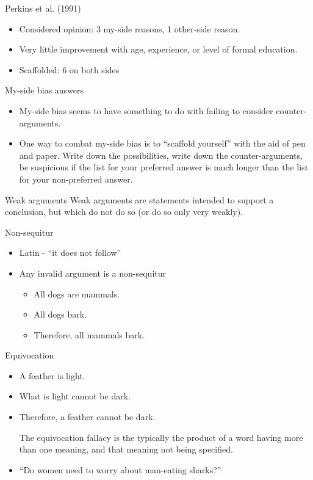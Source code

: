 \documentclass{beamer}
\begin{document}
\begin{frame}{Perkins et al. (1991)}
\begin{itemize}
\item Considered opinion: 3 my-side reasons, 1 other-side reason.
\item Very little improvement with age, experience, or level of formal education.
\item Scaffolded: 6 on both sides
\end{itemize}
\end{frame}

\begin{frame}{My-side bias answers}
\begin{itemize}
\item My-side bias seems to have something to do with failing to consider counter-arguments.
\item One way to combat my-side bias is to ``scaffold yourself'' with the aid of pen and paper. Write down the possibilities, write down the counter-arguments, be suspicious if the list for your preferred answer is much longer than the list for your non-preferred answer.
\end{itemize}
\end{frame}

\begin{frame}{Weak arguments}
Weak arguments are statements intended to support a conclusion, but which do not do so (or do so only very weakly). 
\end{frame}

\begin{frame}{Non-sequitur}
\begin{itemize}
\item Latin - ``it does not follow''
\item Any invalid argument is a non-sequitur
\begin{itemize}
	\item All dogs are mammals.
	\item All dogs bark.
	\item Therefore, all mammals bark.
\end{itemize}
\end{itemize}
\end{frame}

\begin{frame}{Equivocation}
\begin{itemize}
\item A feather is light.
\item What is light cannot be dark.
\item Therefore, a feather cannot be dark.

The equivocation fallacy is the typically the product of a word having more than one meaning, and that meaning not being specified. 

\item ``Do women need to worry about man-eating sharks?''
\end{itemize}
\end{frame}
\end{document}
